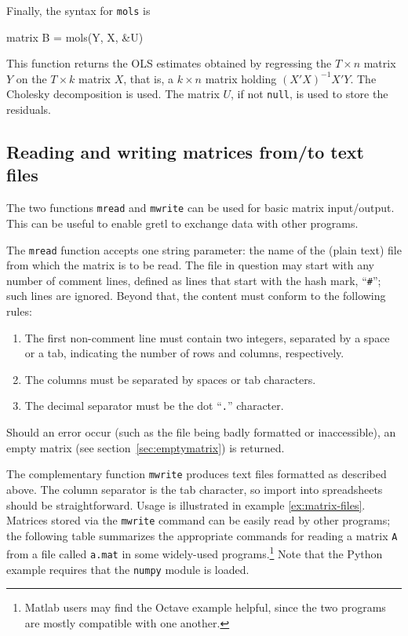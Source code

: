 Finally, the syntax for \texttt{mols} is
%
\begin{code}
matrix B = mols(Y, X, &U)
\end{code}
%
This function returns the OLS estimates obtained by regressing the $T
\times n$ matrix $Y$ on the $T \times k$ matrix $X$, that is, a $k
\times n$ matrix holding $(X'X)^{-1} X'Y$. The Cholesky decomposition
is used. The matrix $U$, if not \texttt{null}, is used to store the
residuals.

\subsection{Reading and writing matrices from/to text files}
\label{sec:matrix-csv}

The two functions \texttt{mread} and \texttt{mwrite} can be used for
basic matrix input/output. This can be useful to enable gretl to
exchange data with other programs.

The \texttt{mread} function accepts one string parameter: the name of
the (plain text) file from which the matrix is to be read.  The file
in question may start with any number of comment lines, defined as
lines that start with the hash mark, ``\texttt{\#}''; such lines are
ignored.  Beyond that, the content must conform to the following
rules:
%
\begin{enumerate}
\item The first non-comment line must contain two integers, separated
  by a space or a tab, indicating the number of rows and columns,
  respectively.
\item The columns must be separated by spaces or tab characters.
\item The decimal separator must be the dot ``\texttt{.}'' character.
\end{enumerate}

Should an error occur (such as the file being badly formatted or
inaccessible), an empty matrix (see section~\ref{sec:emptymatrix}) is
returned.

The complementary function \texttt{mwrite} produces text files
formatted as described above.  The column separator is the tab
character, so import into spreadsheets should be straightforward.
Usage is illustrated in example \ref{ex:matrix-files}.  Matrices stored via
the \texttt{mwrite} command can be easily read by other programs; the
following table summarizes the appropriate commands for reading a
matrix \texttt{A} from a file called \texttt{a.mat} in some
widely-used programs.\footnote{Matlab users may find the Octave
  example helpful, since the two programs are mostly compatible with
  one another.} Note that the Python example requires that the
\texttt{numpy} module is loaded.

